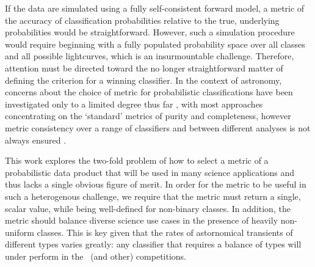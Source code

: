 If the data are simulated using a fully self-consistent forward model, a metric of the accuracy of classification probabilities relative to the true, underlying probabilities would be straightforward.
However, such a simulation procedure would require beginning with a fully populated probability space over all classes and all possible lightcurves, which is an insurmountable challenge.
Therefore, attention must be directed toward the no longer straightforward matter of defining the criterion for a winning classifier.
In the context of astronomy, concerns about the choice of metric for probabilistic classifications have been investigated only to a limited degree thus far \citep{2018SoPh..293...28F, 2017MNRAS.464.4463K}
, with most approaches concentrating on the `standard' metrics of purity and completeness, however metric consistency over a range of classifiers and between different analyses is not always ensured \citep{2018A&C....23...15B}.

This work explores the two-fold problem of how to select a metric of a probabilistic data product that will be used in many science applications and thus lacks a single obvious figure of merit.
In order for the metric to be useful in such a heterogenous challenge, we require that the metric must return a single, scalar value, while being well-defined for non-binary classes.
In addition, the metric should balance diverse science use cases in the presence of heavily non-uniform classes.
This is key given that the rates of astornomical transients of different types varies greatly: any classifier that requires a balance of types will under perform in the \plasticc\ (and other) competitions.

